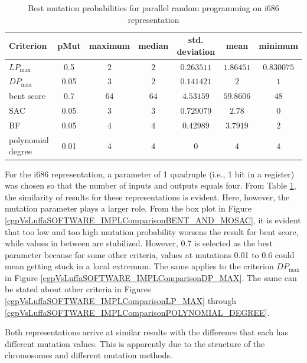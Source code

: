 \begin{table}[bt]
\begin{center}
\begin{tabular}{| l | c | c | c | c | c | c |}
\hline
Criterion & pMut & maximum & median & std. deviation & mean & minimum \\ \hline
$LP_{\max}$ & 0.5 & $2$ & $2$ & $0.263511$ & $1.86451$ & $0.830075$ \\ \hline
$DP_{\max}$ & 0.05 & $3$ & $2$ & $0.141421$ & $2$ & $1$ \\ \hline
bent score & 0.7 & $64$ & $64$ & $4.53159$ & $59.8606$ & $48$ \\ \hline
SAC & 0.05 & $3$ & $3$ & $0.729079$ & $2.78$ & $0$ \\ \hline
BF & 0.05 & $4$ & $4$ & $0.42989$ & $3.7919$ & $2$ \\ \hline
polynomial degree & 0.01 & $4$ & $4$ & $0$ & $4$ & $4$ \\ \hline
\end{tabular}
\caption{Best mutation probabilities for parallel random programming on i686 representation} %
\label{tabSOFTWARE_IMPLParallelRadnomParameters}
\end{center}
\end{table}

\pagebreak
For the i686 representation, a parameter of 1 quadruple (i.e., 1 bit in a register) was chosen so that
the number of inputs and outputs equals four. From Table \ref{tabSOFTWARE_IMPLParallelRadnomParameters}, the
similarity of results for these representations is evident. Here, however, the mutation parameter plays a larger role.
From the box plot in Figure \ref{cgpVsLuffaSOFTWARE_IMPLComparisonBENT_AND_MOSAC}, it is evident that
too low and too high mutation probability worsens the result for bent score,
while values in between are stabilized. However, 0.7 is selected as the best parameter
because for some other criteria, values at mutations 0.01 to 0.6 could mean
getting stuck in a local extremum. The same applies to the criterion $DP_{\max}$
in Figure \ref{cgpVsLuffaSOFTWARE_IMPLComparisonDP_MAX}. The same can be stated about other criteria in Figures
\ref{cgpVsLuffaSOFTWARE_IMPLComparisonLP_MAX} through \ref{cgpVsLuffaSOFTWARE_IMPLComparisonPOLYNOMIAL_DEGREE}.

Both representations arrive at similar results with the difference that each has different mutation values.
This is apparently due to the structure of the chromosomes and different mutation methods.


